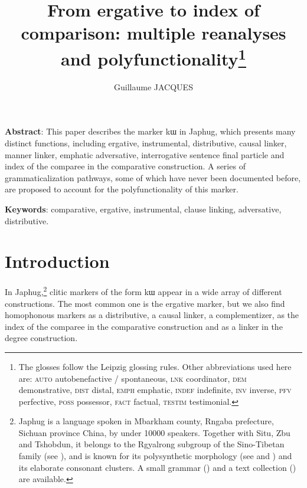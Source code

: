 \documentclass[oldfontcommands,oneside,a4paper,11pt]{article}
\newcommand{\ipa}[1]{{\phon #1}} %
\begin{document}
 
\linenumbers

\title{From ergative to index of comparison: multiple reanalyses and polyfunctionality\footnote{The glosses follow the Leipzig glossing rules. Other abbreviations used here are:   \textsc{auto} autobenefactive / spontaneous, \textsc{lnk} coordinator, \textsc{dem} demonstrative, \textsc{dist} distal, \textsc{emph} emphatic, \textsc{indef} indefinite, \textsc{inv} inverse,  \textsc{pfv} perfective, \textsc{poss} possessor, \textsc{fact} factual,  \textsc{testim} testimonial.} }

\author{Guillaume JACQUES}
\maketitle
 
\textbf{Abstract}: This paper describes the marker  \ipa{kɯ} in Japhug, which presents many distinct functions, including ergative, instrumental, distributive, causal linker, manner linker, emphatic adversative, interrogative sentence final particle and index of the comparee in the comparative construction. A series of grammaticalization pathways, some of which have never been documented before, are proposed to account for the polyfunctionality of this marker.

\textbf{Keywords}: comparative, ergative, instrumental, clause linking, adversative, distributive.
 
 \section{Introduction}
  
 
In Japhug,\footnote{Japhug is a language spoken in Mbarkham county, Rngaba prefecture, Sichuan province China, by under 10000 speakers. Together with Situ, Zbu and Tshobdun, it belongs to the Rgyalrong subgroup of the Sino-Tibetan family (see \citealt{jackson00sidaba}), and is known for its polysynthetic morphology (see \citet{jacques13harmonization} and  \citet{jacques14antipassive}) and its elaborate consonant clusters. A small grammar  (\citealt{jacques08zh}) and a text collection (\citealt{jacques10gesar}) are available.   } clitic markers of the form \ipa{kɯ} appear in a wide array of different constructions. The most common one is the ergative marker, but we also find homophonous markers as a distributive, a causal linker, a complementizer,    as the index of the comparee in the comparative construction  and as a linker in the degree construction.
\end{document}
